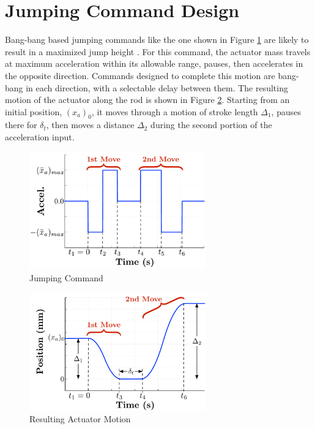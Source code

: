 \documentclass[10pt,twocolumn,letterpaper]{article}
\begin{document}
% 
        

\section{Jumping Command Design}
\label{sec:control_input_exp}

Bang-bang based jumping commands like the one shown in Figure \ref{fig:sim_command} are likely to result in a maximized jump height \cite{Vaughan2013}. For this command, the actuator mass travels at maximum acceleration within its allowable range, pauses, then accelerates in the opposite direction. Commands designed to complete this motion are bang-bang in each direction, with a selectable delay between them. The resulting motion of the actuator along the rod is shown in Figure \ref{fig:command_act_motion}. Starting from an initial position, $(x_a)_0$, it moves through a motion of stroke length $\Delta_1$, pauses there for $\delta_t$, then moves a distance $\Delta_2$ during the second portion of the acceleration input.

%
\begin{figure}[tb]
\begin{center}
\includegraphics[width = 3in]{figures/input_shaping/Command_form.pdf}  
\caption{Jumping Command}
\label{fig:sim_command}
\end{center}
\end{figure}
%
%
\begin{figure}[tb]
\begin{center}
\includegraphics[width = 3in]{figures/input_shaping/Jumping_command_position.pdf}  
\caption{Resulting Actuator Motion}
\label{fig:command_act_motion}
\end{center}
\end{figure}
%
\end{document}
